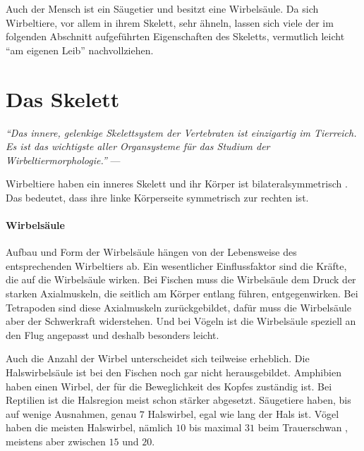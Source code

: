 Auch der Mensch ist ein Säugetier und besitzt eine Wirbelsäule. Da sich Wirbeltiere, vor allem in ihrem Skelett, sehr ähneln, lassen sich viele der im folgenden Abschnitt aufgeführten Eigenschaften des Skeletts, vermutlich leicht "`am eigenen Leib"' nachvollziehen.


\newpage
\section{Das Skelett}
\label{biology_skeleton}

\vspace{0.5cm}
\begin{center}
 \begin{minipage}{12cm}
  \emph{"`Das innere, gelenkige Skelettsystem der Vertebraten ist einzigartig im Tierreich. Es ist das wichtigste aller Organsysteme für das Studium der Wirbeltiermorphologie."'}
  --- \cite[S.\ 131]{Vergleichende_Anatomie}
 \end{minipage}
\end{center}


Wirbeltiere haben ein inneres Skelett und ihr Körper ist bilateralsymmetrisch \cite[S.\ 27]{Vergleichende_Anatomie}. Das bedeutet, dass ihre linke Körperseite symmetrisch zur rechten ist. 

\paragraph{Wirbelsäule}
Aufbau und Form der Wirbelsäule hängen von der Lebensweise des entsprechenden Wirbeltiers ab. Ein wesentlicher Einflussfaktor sind die Kräfte, die auf die Wirbelsäule wirken. 
Bei Fischen muss die Wirbelsäule dem Druck der starken Axialmuskeln, die seitlich am Körper entlang führen, entgegenwirken.
Bei Tetrapoden sind diese Axialmuskeln zurückgebildet, dafür muss die Wirbelsäule aber der Schwerkraft widerstehen.
Und bei Vögeln ist die Wirbelsäule speziell an den Flug angepasst und deshalb \ua besonders leicht. \cite[\mbox{Abschnitt 9.2}, S.\ 168 ff.]{Vergleichende_Anatomie}

Auch die Anzahl der Wirbel unterscheidet sich teilweise erheblich. 
Die Halswirbelsäule ist \zb bei den Fischen noch gar nicht herausgebildet. Amphibien haben einen Wirbel, der für die Beweglichkeit des Kopfes zuständig ist. Bei Reptilien ist die Halsregion meist schon stärker abgesetzt. Säugetiere haben, bis auf wenige Ausnahmen, genau $7$ Halswirbel, egal wie lang der Hals ist. Vögel haben die meisten Halswirbel, nämlich $10$ bis maximal $31$ beim Trauerschwan \cite{WikipediaVogelskelett}, meistens aber zwischen $15$ und $20$. \cite[Abschnitt 9.2]{Vergleichende_Anatomie}

